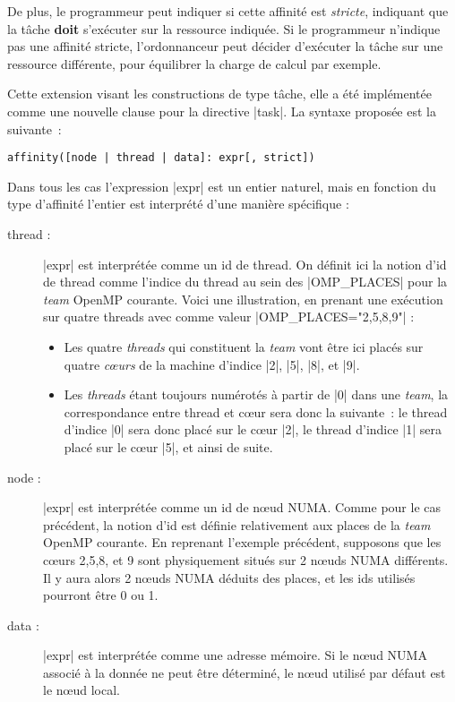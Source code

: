 De plus, le programmeur peut indiquer si cette affinité est \emph{stricte}, indiquant que la tâche \textbf{doit} s'exécuter sur la ressource indiquée.
Si le programmeur n'indique pas une affinité stricte, l'ordonnanceur peut décider d'exécuter la tâche sur une ressource différente, pour équilibrer la charge de calcul par exemple.

Cette extension visant les constructions de type tâche, elle a été implémentée comme une nouvelle clause pour la directive |task|. La syntaxe proposée est la suivante~:

\begin{lstlisting}
affinity([node | thread | data]: expr[, strict])
\end{lstlisting}

Dans tous les cas l'expression |expr| est un entier naturel, mais en fonction du type d'affinité l'entier est interprété d'une manière spécifique :

\begin{description}
  \item [thread :]
    |expr| est interprétée comme un id de thread. On définit ici la notion d'id de thread comme l'indice du thread au sein des |OMP_PLACES| pour la \textit{team} OpenMP courante.
    Voici une illustration, en prenant une exécution sur quatre threads avec comme valeur |OMP_PLACES="{2},{5},{8},{9}"| :
    \begin{itemize}
      \item Les quatre \emph{threads} qui constituent la \emph{team} vont être ici placés sur quatre \emph{cœurs} de la machine d'indice |2|, |5|, |8|, et |9|.
      \item Les \emph{threads} étant toujours numérotés à partir de |0| dans une \emph{team}, la correspondance entre thread et cœur sera donc la suivante~: le thread d'indice |0| sera donc placé sur le cœur |2|, le thread d'indice |1| sera placé sur le cœur |5|, et ainsi de suite.
    \end{itemize}
  \item [node :]
    |expr| est interprétée comme un id de nœud NUMA. Comme pour le cas précédent, la notion d'id est définie relativement aux places de la \textit{team} OpenMP courante.
    En reprenant l'exemple précédent, supposons que les cœurs 2,5,8, et 9 sont physiquement situés sur 2 nœuds NUMA différents. Il y aura alors 2 nœuds NUMA déduits des places, et les ids utilisés pourront être 0 ou 1.
  \item [data :]
    |expr| est interprétée comme une adresse mémoire. Si le nœud NUMA associé à la donnée ne peut être déterminé, le nœud utilisé par défaut est le nœud local.
\end{description}

